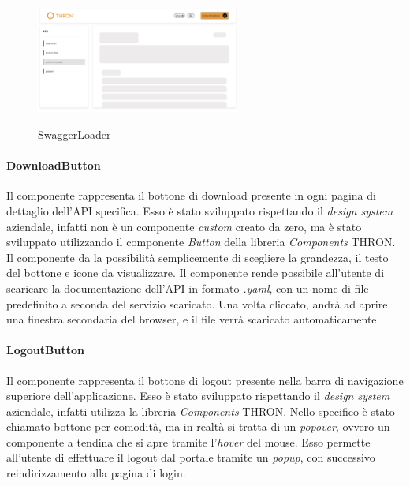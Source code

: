 \begin{figure}[ht]
  \centering
  \includegraphics[width=0.6\textwidth, alt={Skeleton loader di caricamento per contenuto principale}]{images/frontend/SwaggerLoader.jpg}
  \caption{SwaggerLoader}\label{fig:swagger-loader}
\end{figure}

\paragraph{DownloadButton}\label{par:download-button}
Il componente rappresenta il bottone di download presente in ogni pagina di dettaglio dell'API specifica. Esso è stato sviluppato rispettando il \textit{design system}
aziendale, infatti non è un componente \textit{custom} creato da zero, ma è stato sviluppato utilizzando il componente \textit{Button} della libreria \textit{Components} THRON.
Il componente da la possibilità semplicemente di scegliere la grandezza, il testo del bottone e icone da visualizzare.
Il componente rende possibile all'utente di scaricare la documentazione dell'API in formato \textit{.yaml}, con un nome di file predefinito a seconda 
del servizio scaricato. Una volta cliccato, andrà ad aprire una finestra secondaria del browser, e il file verrà scaricato automaticamente.\\

\paragraph{LogoutButton}\label{par:logout-button}
Il componente rappresenta il bottone di logout presente nella barra di navigazione superiore dell'applicazione.
Esso è stato sviluppato rispettando il \textit{design system} aziendale, infatti utilizza la libreria \textit{Components} THRON.
Nello specifico è stato chiamato bottone per comodità, ma in realtà si tratta di un \textit{popover}, ovvero un componente a tendina che si apre
tramite l'\textit{hover} del mouse. Esso permette all'utente di effettuare il logout dal portale tramite un \textit{popup}, con successivo reindirizzamento
alla pagina di login.


